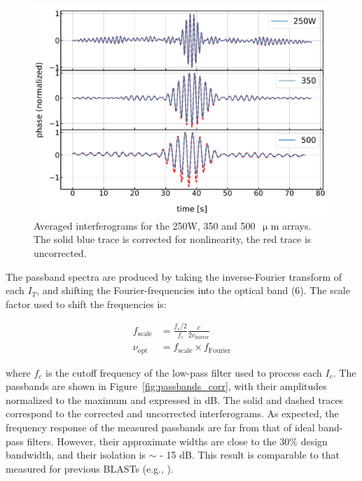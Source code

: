\begin{figure}[!htbp]
\centering
\includegraphics[width=\textwidth]{figures/blast_data/fts/fts_avg_interfs_raw}
\caption{Averaged interferograms for the 250W, 350 and 500~$\upmu$m arrays. The solid blue trace is corrected for nonlinearity, the red trace is uncorrected.}
\label{fig:avg interfs}
\end{figure}

The passband spectra are produced by taking the inverse-Fourier transform of each $I_{T}$, and shifting the Fourier-frequencies into the optical band (6). The scale factor used to shift the frequencies is:

\begin{equation}\label{eq:fts scale}
  \begin{aligned}
  f_{\mathrm{scale}} &= \frac{f_{s}/2}{f_{c}}\frac{c}{2v_{\mathrm{mirror}}} \\
  \nu_{\mathrm{opt}} &= f_{\mathrm{scale}} \times f_{\mathrm{Fourier}}
  \end{aligned}
\end{equation}

where $f_{c}$ is the cutoff frequency of the low-pass filter used to process each $I_{c}$. The passbands are shown in Figure~\ref{fig:passbands_corr}, with their amplitudes normalized to the maximum and expressed in dB. The solid and dashed traces correspond to the corrected and uncorrected interferograms. As expected, the frequency response of the measured passbands are far from that of ideal band-pass filters. However, their approximate widths are close to the 30\% design bandwidth, and their isolation is $\sim$ - 15 dB. This result is comparable to that measured for previous BLASTs (e.g., \citet{galitzki}).

